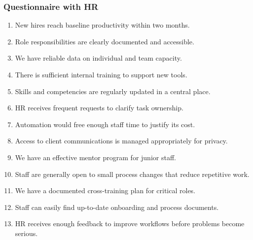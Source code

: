 \documentclass[12pt,a4paper]{report}
\begin{document}
\subsubsection{Questionnaire with HR}
\begin{enumerate}[leftmargin=2em]
    \item New hires reach baseline productivity within two months.
    \item Role responsibilities are clearly documented and accessible.
    \item We have reliable data on individual and team capacity.
    \item There is sufficient internal training to support new tools.
    \item Skills and competencies are regularly updated in a central place.
    \item HR receives frequent requests to clarify task ownership.
    \item Automation would free enough staff time to justify its cost.
    \item Access to client communications is managed appropriately for privacy.
    \item We have an effective mentor program for junior staff.
    \item Staff are generally open to small process changes that reduce repetitive work.
    \item We have a documented cross-training plan for critical roles.
    \item Staff can easily find up-to-date onboarding and process documents.
    \item HR receives enough feedback to improve workflows before problems become serious.
\end{enumerate}
\end{document}
